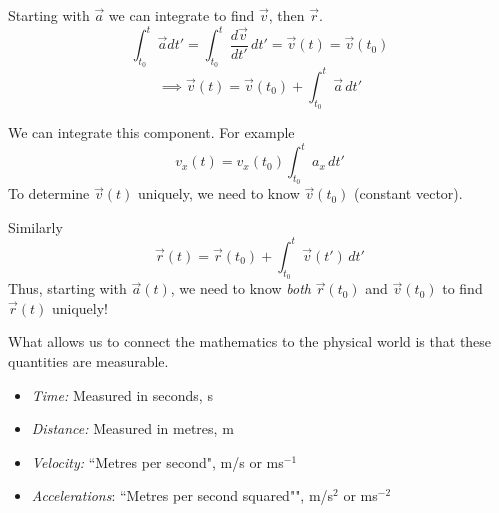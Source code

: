 \documentclass[10pt]{scrartcl}
\begin{document}

Starting with $\vec{a}$ we can integrate to find $\vec{v}$, then $\vec{r}$. 
\[\int_{t_0}^{t} \vec{a}dt' = \int_{t_0}^{t} \frac{d\vec{v}}{dt'}\,dt' = \vec{v}(t) = \vec{v}(t_0)
\]
\[\implies \vec{v}(t) = \vec{v}(t_0) + \int_{t_0}^t \vec{a}\,dt'\]

We can integrate this component. For example 
\[v_x(t) = v_x(t_0) \int_{t_0}^t a_x\,dt'\]
To determine $\vec{v}(t)$ uniquely, we need to know $\vec{v}(t_0)$ (constant vector). 

Similarly
\[\vec{r}(t) = \vec{r}(t_0) + \int_{t_0}^t \vec{v}(t')\,dt'\]
Thus, starting with $\vec{a}(t)$, we need to know \emph{both} $\vec{r}(t_0)$ and $\vec{v}(t_0)$ to find $\vec{r}(t)$ uniquely! 

What allows us to connect the mathematics to the physical world is that these quantities are measurable. \\

\begin{definition}[SI Units]\begin{itemize}
\item \emph{Time:} Measured in seconds, s

\item \emph{Distance:} Measured in metres, m

\item \emph{Velocity:} ``Metres per second", m/s or ms$^{-1}$
	
\item \emph{Accelerations}: ``Metres per second squared"", m/s$^2$ or ms$^{-2}$
\end{itemize}
\end{definition}\vsp
\end{document}
